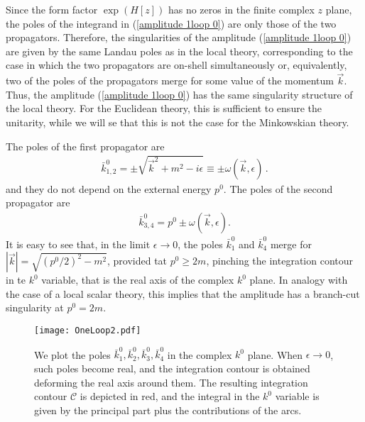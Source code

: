 \documentclass[a4paper,11pt]{article}
\newcommand{\bea}{\begin{eqnarray}}
\newcommand{\eea}{\end{eqnarray}}
\begin{document}
Since the form factor $\exp\left(H\left[z\right]\right)$ has no zeros  in the finite complex $z$ plane, the poles of the integrand in (\ref{amplitude 1loop 0}) are only those of the two propagators. Therefore, the singularities of the amplitude (\ref{amplitude 1loop 0}) are given by the same Landau poles as in the local theory, corresponding to the case in which the two propagators are on-shell simultaneously or, equivalently, two of the poles of the propagators merge for some value of the momentum $\vec{k}$. Thus, the amplitude (\ref{amplitude 1loop 0}) has the same singularity structure of the local theory. For the Euclidean theory, this is sufficient to ensure the unitarity, while we will se that this is not the case for the Minkowskian theory. 


The poles of the first propagator are
\bea\label{poles 1}
\bar{k}^0_{1,2}
= \pm \sqrt{\vec{k}^2 + m^2 - i \epsilon}\equiv
 \pm \omega(\vec{k},\epsilon)\, . 
\eea
and they do not depend on the
external energy $p^0$. The poles of the second propagator are
\bea\label{poles 2}
\bar{k}^0_{3,4} = p^0 \pm
\omega(\vec{k},\epsilon). 
\eea
It is easy to see that, in the limit $\epsilon \rightarrow 0$, the poles $\bar{k}^0_{1}$ and $\bar{k}^0_{4}$ merge  for $|\vec{k}|=\sqrt{(p^0/2)^2-m^2}$, provided tat $p^0 \geq 2m$, pinching the integration contour in te $k^0$ variable, that is the real axis of the complex $k^0$ plane. In analogy with the case of a local scalar theory, this  implies that the amplitude has a branch-cut singularity at $p^0 = 2m$. 







\begin{figure}
	\begin{center}
		\hspace{-1cm}
		\texttt{[image: OneLoop2.pdf]}
	\end{center}
	\caption{We plot the poles $\bar{k}^0_1, \bar{k}^0_2,\bar{k}^0_3,\bar{k}^0_4$ in the complex $k^0$ plane. When $\epsilon\rightarrow 0$, such poles become real, and the integration contour is obtained deforming the real axis around  them. The resulting integration contour $\mathcal{C}$ is depicted in red, and the integral in the $k^0$ variable is given by the principal part    plus the contributions of  the  arcs. %
		}
	\label{Fig3}
\end{figure}
\end{document}
